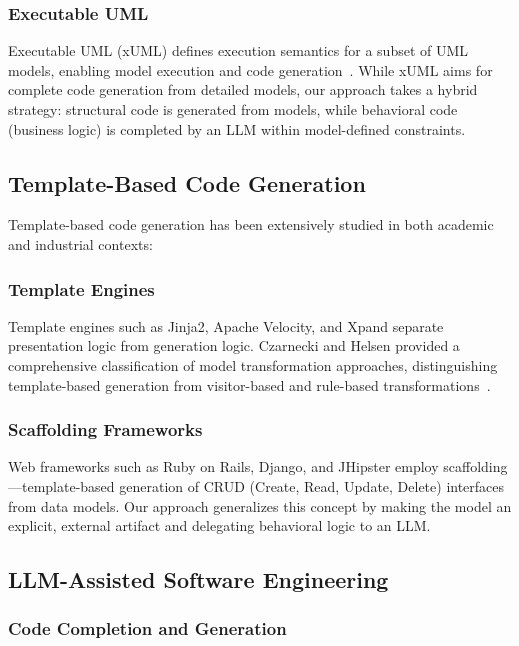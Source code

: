 \documentclass[11pt,a4paper]{article}
\begin{document}
{\subsubsection{Executable UML}

Executable UML (xUML) defines execution semantics for a subset of UML models, enabling model execution and code generation~\cite{mellor2002executable}. While xUML aims for complete code generation from detailed models, our approach takes a hybrid strategy: structural code is generated from models, while behavioral code (business logic) is completed by an LLM within model-defined constraints.

\subsection{Template-Based Code Generation}

Template-based code generation has been extensively studied in both academic and industrial contexts:

\subsubsection{Template Engines}

Template engines such as Jinja2, Apache Velocity, and Xpand separate presentation logic from generation logic. Czarnecki and Helsen provided a comprehensive classification of model transformation approaches, distinguishing template-based generation from visitor-based and rule-based transformations~\cite{czarnecki2006feature}.

\subsubsection{Scaffolding Frameworks}

Web frameworks such as Ruby on Rails, Django, and JHipster employ scaffolding---template-based generation of CRUD (Create, Read, Update, Delete) interfaces from data models. Our approach generalizes this concept by making the model an explicit, external artifact and delegating behavioral logic to an LLM.

\subsection{LLM-Assisted Software Engineering}

\subsubsection{Code Completion and Generation}

}
\end{document}
